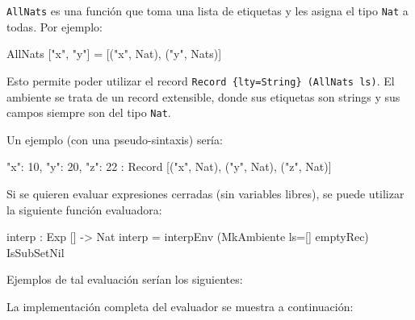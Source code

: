 \texttt{AllNats} es una función que toma una lista de etiquetas y les asigna el tipo \texttt{Nat} a todas. Por ejemplo:

\begin{code}
AllNats ["x", "y"] = [("x", Nat), ("y", Nats)]
\end{code}

Esto permite poder utilizar el record \texttt{Record \{lty=String\} (AllNats ls)}. El ambiente se trata de un record extensible, donde sus etiquetas son strings y sus campos siempre son del tipo \texttt{Nat}.

Un ejemplo (con una pseudo-sintaxis) sería:

\begin{code}
{ "x": 10, "y": 20, "z": 22 } :
  Record [("x", Nat), ("y", Nat), ("z", Nat)]
\end{code}

Si se quieren evaluar expresiones cerradas (sin variables libres), se puede utilizar la siguiente función evaluadora:

\begin{code}
interp : Exp [] -> Nat
interp = interpEnv (MkAmbiente {ls=[]} emptyRec) IsSubSetNil
\end{code}

Ejemplos de tal evaluación serían los siguientes:


La implementación completa del evaluador se muestra a continuación:

